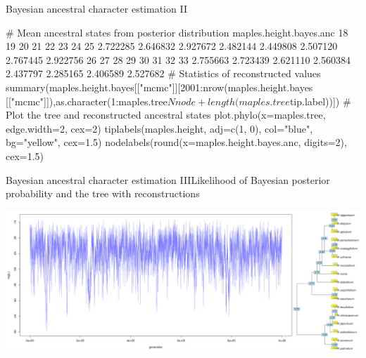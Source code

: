 \documentclass[compress, xelatex, 11pt, xcolor=svgnames, aspectratio=169,
	hyperref={
		bookmarks=true,
		unicode=true,
		colorlinks=true,
		pdftitle={Molecular data in R},
		plainpages=false,
		pdfauthor={Vojtech Zeisek},
		pdfsubject={Course about phylogeny and evolution in R},
		pdfcreator={XeLaTeX},
		pdfkeywords={R, evolution, phylogeny, molecular data},
		linkcolor=Crimson, %
		anchorcolor=Magenta, %
		citecolor=Magenta, %
		filecolor=Magenta, %
		menucolor=Magenta, %
		urlcolor=DodgerBlue, %
		},
	url={hyphens, lowtilde} %
	]{beamer}
\begin{document}
\begin{frame}[fragile]{Bayesian ancestral character estimation II}
	\begin{spluscode}
    # Mean ancestral states from posterior distribution
    maples.height.bayes.anc
          18       19       20       21       22       23       24       25
    2.722285 2.646832 2.927672 2.482144 2.449808 2.507120 2.767445 2.922756
          26       27       28       29       30       31       32       33
    2.755663 2.723439 2.621110 2.560384 2.437797 2.285165 2.406589 2.527682
    # Statistics of reconstructed values
    summary(maples.height.bayes[["mcmc"]][2001:nrow(maples.height.bayes
      [["mcmc"]]),as.character(1:maples.tree$Nnode+length(
      maples.tree$tip.label))])
    # Plot the tree and reconstructed ancestral states
    plot.phylo(x=maples.tree, edge.width=2, cex=2)
    tiplabels(maples.height, adj=c(1, 0), col="blue", bg="yellow", cex=1.5)
    nodelabels(round(x=maples.height.bayes.anc, digits=2), cex=1.5)
	\end{spluscode}
\end{frame}

\begin{frame}{Bayesian ancestral character estimation III}{Likelihood of Bayesian posterior probability and the tree with reconstructions}
	\begin{center}
		\includegraphics[width=\textwidth]{ancbayes.png}
	\end{center}
\end{frame}
\end{document}
